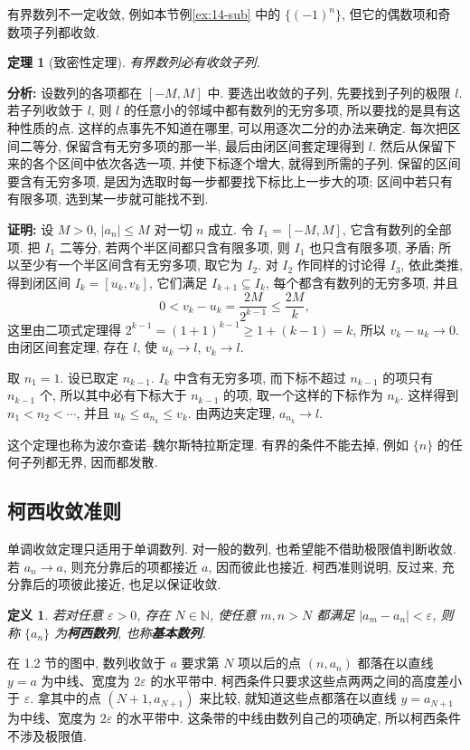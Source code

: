 \documentclass[UTF8,openany]{ctexbook}
\theoremstyle{chinesetextbook}
\newtheorem{definition}{定义}[section]
\newtheorem{theorem}{定理}[section]
\newenvironment{cnproof}{\par\indent\textbf{证明:} \ignorespaces}{\par}
\begin{document}
有界数列不一定收敛, 例如本节例\ref{ex:14-sub} 中的 $\{(-1)^n\}$, 但它的偶数项和奇数项子列都收敛.
\begin{theorem}[致密性定理]
有界数列必有收敛子列.
\end{theorem}
\par\indent\textbf{分析:} 设数列的各项都在 $[-M,M]$ 中. 要选出收敛的子列, 先要找到子列的极限 $l$. 若子列收敛于 $l$, 则 $l$ 的任意小的邻域中都有数列的无穷多项, 所以要找的是具有这种性质的点. 这样的点事先不知道在哪里, 可以用逐次二分的办法来确定. 每次把区间二等分, 保留含有无穷多项的那一半, 最后由闭区间套定理得到 $l$. 然后从保留下来的各个区间中依次各选一项, 并使下标逐个增大, 就得到所需的子列. 保留的区间要含有无穷多项, 是因为选取时每一步都要找下标比上一步大的项; 区间中若只有有限多项, 选到某一步就可能找不到.
\begin{cnproof}
设 $M>0$, $|a_n|\le M$ 对一切 $n$ 成立. 令 $I_1=[-M,M]$, 它含有数列的全部项. 把 $I_1$ 二等分, 若两个半区间都只含有限多项, 则 $I_1$ 也只含有限多项, 矛盾; 所以至少有一个半区间含有无穷多项, 取它为 $I_2$. 对 $I_2$ 作同样的讨论得 $I_3$, 依此类推, 得到闭区间 $I_k=[u_k,v_k]$, 它们满足 $I_{k+1}\subseteq I_k$, 每个都含有数列的无穷多项, 并且
\[
0<v_k-u_k=\frac{2M}{2^{k-1}}\le\frac{2M}k,
\]
这里由二项式定理得 $2^{k-1}=(1+1)^{k-1}\ge1+(k-1)=k$, 所以 $v_k-u_k\to0$. 由闭区间套定理, 存在 $l$, 使 $u_k\to l$, $v_k\to l$.

取 $n_1=1$. 设已取定 $n_{k-1}$. $I_k$ 中含有无穷多项, 而下标不超过 $n_{k-1}$ 的项只有 $n_{k-1}$ 个, 所以其中必有下标大于 $n_{k-1}$ 的项, 取一个这样的下标作为 $n_k$. 这样得到 $n_1<n_2<\cdots$, 并且 $u_k\le a_{n_k}\le v_k$. 由两边夹定理, $a_{n_k}\to l$.
\end{cnproof}
这个定理也称为波尔查诺--魏尔斯特拉斯定理. 有界的条件不能去掉, 例如 $\{n\}$ 的任何子列都无界, 因而都发散.
\subsection{柯西收敛准则}
单调收敛定理只适用于单调数列. 对一般的数列, 也希望能不借助极限值判断收敛. 若 $a_n\to a$, 则充分靠后的项都接近 $a$, 因而彼此也接近. 柯西准则说明, 反过来, 充分靠后的项彼此接近, 也足以保证收敛.
\begin{definition}
若对任意 $\varepsilon>0$, 存在 $N\in\mathbb N$, 使任意 $m,n>N$ 都满足 $|a_m-a_n|<\varepsilon$, 则称 $\{a_n\}$ 为\textbf{柯西数列}, 也称\textbf{基本数列}.
\end{definition}
在 1.2 节的图中, 数列收敛于 $a$ 要求第 $N$ 项以后的点 $(n,a_n)$ 都落在以直线 $y=a$ 为中线、宽度为 $2\varepsilon$ 的水平带中. 柯西条件只要求这些点两两之间的高度差小于 $\varepsilon$. 拿其中的点 $(N+1,a_{N+1})$ 来比较, 就知道这些点都落在以直线 $y=a_{N+1}$ 为中线、宽度为 $2\varepsilon$ 的水平带中. 这条带的中线由数列自己的项确定, 所以柯西条件不涉及极限值.
\end{document}
